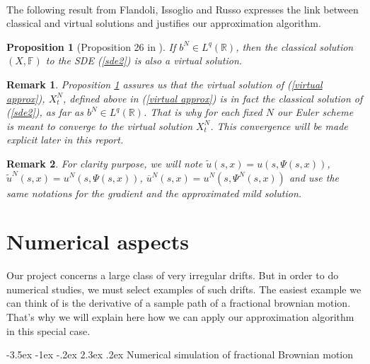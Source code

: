 \documentclass[11pt]{enstaPRE}
\makeatletter
\renewcommand\section{\@startsection {section}{1}{\z@}%
    {-3.5ex \@plus -1ex \@minus -.2ex}%
    {2.3ex \@plus.2ex}%
    {\centering\large\scshape\bfseries}}
\newtheorem{Pro}[theo]{Proposition}
\newtheorem{rem}{Remark}
\newcommand{\R}{\mathbb{R}}
\makeatother
\begin{document}
\paragraph{}
The following result from Flandoli, Issoglio and Russo expresses the link between classical and virtual solutions and justifies our approximation algorithm.

\begin{Pro}[Proposition 26 in \cite{Fla-Iss-Rus-2017}]\label{rus}
    If $b^N\in L^q(\R)$, then the classical solution $(X,\mathbb{F})$ to the SDE (\ref{sde2}) is also a virtual solution.
\end{Pro}

\begin{rem}
    Proposition \ref{rus} assures us that the virtual solution of (\ref{virtual approx}), $X^N_t$, defined above in (\ref{virtual approx}) is in fact the classical solution of (\ref{sde2}), as far as $b^N\in L^q(\R)$. That is why for each fixed $N$ our Euler scheme is meant to converge to the virtual solution $X^N_t$. This convergence will be made explicit later in this report.
\end{rem}

\begin{rem}  
    For clarity purpose, we will note $\tilde{u}\left(s,x\right) = u\left(s,\Psi\left(s,x\right)\right)$, $\tilde{u}^N\left(s,x\right) = u^N\left(s,\Psi\left(s,x\right)\right)$, $\overline{u}^N\left(s,x\right) = u^N\left(s,\Psi^N\left(s,x\right)\right)$ and use the same notations for the gradient and the approximated mild solution. 
\end{rem}

\part{Numerical aspects}

Our project concerns a large class of very irregular drifts. But in order to do numerical studies, we must select examples of such drifts. The easiest example we can think of is the derivative of a sample path of a fractional brownian motion. That's why we will explain here how we can apply our approximation algorithm in this special case.

\section{Numerical simulation of fractional Brownian motion}    
\end{document}
